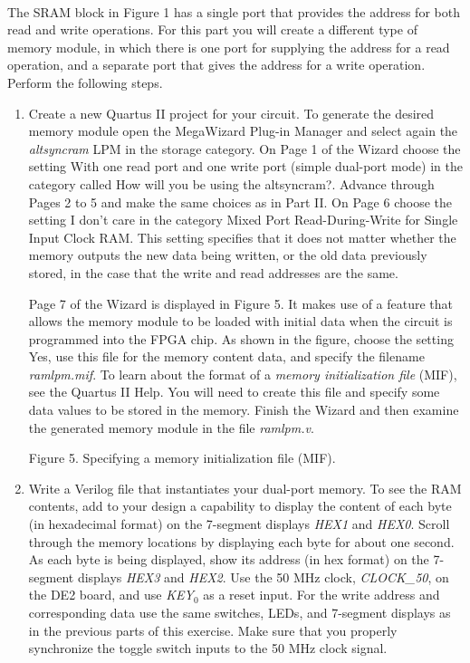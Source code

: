 \documentclass[psfig,10pt,fullpage]{article}
\begin{document}
~\\
The SRAM block in Figure 1 has a single port that provides the address for both read and
write operations. For this part you will create a different type of memory module, in
which there is one port for supplying the address for a read operation, and a separate
port that gives the address for a write operation. Perform the following steps.

\begin{enumerate}
\item Create a new Quartus II project for your circuit. To generate the desired memory
module open the MegaWizard Plug-in Manager and select again the 
{\it altsyncram} LPM in the {\sf storage} category. On Page 1 of the Wizard choose the
setting {\sf With one read port and one write port (simple dual-port mode)} in the category
called {\sf How will you be using the altsyncram?}. Advance through Pages 2 to 5 and make
the same choices as in Part II. On Page 6 choose the setting {\sf I don't care} in the category
{\sf Mixed Port Read-During-Write for Single Input Clock RAM}. This setting specifies that
it does not matter whether the memory outputs the new data being written, or the old data
previously stored, in the case that the write and read addresses are the same.

Page 7 of the Wizard is displayed in Figure 5. It makes use of
a feature that allows the memory module to be loaded with initial data when the circuit is
programmed into the FPGA chip. As shown in the figure, choose the setting {\sf Yes, use this
file for the memory content data}, and specify the filename {\it ramlpm.mif}. To learn
about the format of a {\it memory initialization file} (MIF), see the Quartus II Help.
You will need to create this file and specify some data values to be stored in the memory.
Finish the Wizard and then examine the generated memory module in the file {\it ramlpm.v}.

\begin{figure}[H]
\scriptsize
\centerline{
\hbox{}}
\end{figure}
\centerline{Figure 5.  Specifying a memory initialization file (MIF).}

\item Write a Verilog file that instantiates your dual-port memory. 
To see the RAM contents, add to your design a capability to display the
content of each byte (in hexadecimal format) on the 7-segment displays
{\it HEX1} and {\it HEX0}. Scroll through the memory locations by displaying each byte for
about one second. As each byte is being displayed, show its address (in hex format)
on the 7-segment displays {\it HEX3} and {\it HEX2}. Use the 50 MHz clock, {\it CLOCK\_50}, on
the DE2 board, and use {\it KEY}$_0$ as a reset input. For the write address and
corresponding data use the same switches, LEDs, and 7-segment displays as in the previous 
parts of this exercise. Make sure that you properly synchronize the toggle switch inputs
to the 50 MHz clock signal.


\end{enumerate}
\end{document}
